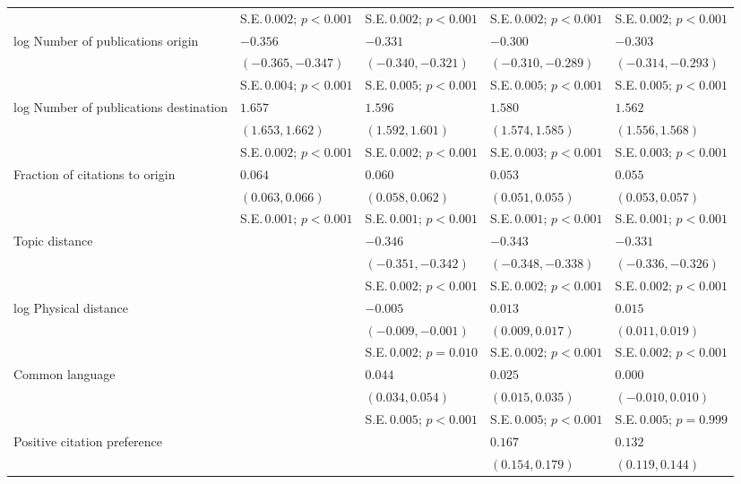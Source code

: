 \begin{table}[H]
\begin{adjustbox}{max width=\textwidth}
\begin{tabular}{lllll}
 & S.E.\,$0.002$; ${p < 0.001}$ & S.E.\,$0.002$; ${p < 0.001}$ & S.E.\,$0.002$; ${p < 0.001}$ & S.E.\,$0.002$; ${p < 0.001}$\\ [0.8ex]  
log Number of publications origin & $-0.356$ & $-0.331$ & $-0.300$ & $-0.303$\\ 
 & $(-0.365, -0.347)$ & $(-0.340, -0.321)$ & $(-0.310, -0.289)$ & $(-0.314, -0.293)$\\ 
 & S.E.\,$0.004$; ${p < 0.001}$ & S.E.\,$0.005$; ${p < 0.001}$ & S.E.\,$0.005$; ${p < 0.001}$ & S.E.\,$0.005$; ${p < 0.001}$\\ [0.8ex]  
log Number of publications destination & $1.657$ & $1.596$ & $1.580$ & $1.562$\\ 
 & $(1.653, 1.662)$ & $(1.592, 1.601)$ & $(1.574, 1.585)$ & $(1.556, 1.568)$\\ 
 & S.E.\,$0.002$; ${p < 0.001}$ & S.E.\,$0.002$; ${p < 0.001}$ & S.E.\,$0.003$; ${p < 0.001}$ & S.E.\,$0.003$; ${p < 0.001}$\\ [0.8ex]  
Fraction of citations to origin & $0.064$ & $0.060$ & $0.053$ & $0.055$\\ 
 & $(0.063, 0.066)$ & $(0.058, 0.062)$ & $(0.051, 0.055)$ & $(0.053, 0.057)$\\ 
 & S.E.\,$0.001$; ${p < 0.001}$ & S.E.\,$0.001$; ${p < 0.001}$ & S.E.\,$0.001$; ${p < 0.001}$ & S.E.\,$0.001$; ${p < 0.001}$\\ [0.8ex]  
Topic distance &  & $-0.346$ & $-0.343$ & $-0.331$\\ 
 &  & $(-0.351, -0.342)$ & $(-0.348, -0.338)$ & $(-0.336, -0.326)$\\ 
 &  & S.E.\,$0.002$; ${p < 0.001}$ & S.E.\,$0.002$; ${p < 0.001}$ & S.E.\,$0.002$; ${p < 0.001}$\\ [0.8ex]  
log Physical distance &  & $-0.005$ & $0.013$ & $0.015$\\ 
 &  & $(-0.009, -0.001)$ & $(0.009, 0.017)$ & $(0.011, 0.019)$\\ 
 &  & S.E.\,$0.002$; ${p = 0.010}$ & S.E.\,$0.002$; ${p < 0.001}$ & S.E.\,$0.002$; ${p < 0.001}$\\ [0.8ex]  
Common language &  & $0.044$ & $0.025$ & $0.000$\\ 
 &  & $(0.034, 0.054)$ & $(0.015, 0.035)$ & $(-0.010, 0.010)$\\ 
 &  & S.E.\,$0.005$; ${p < 0.001}$ & S.E.\,$0.005$; ${p < 0.001}$ & S.E.\,$0.005$; ${p = 0.999}$\\ [0.8ex]  
Positive citation preference &  &  & $0.167$ & $0.132$\\ 
 &  &  & $(0.154, 0.179)$ & $(0.119, 0.144)$\\ 

\end{tabular}
\end{adjustbox}
\end{table}
